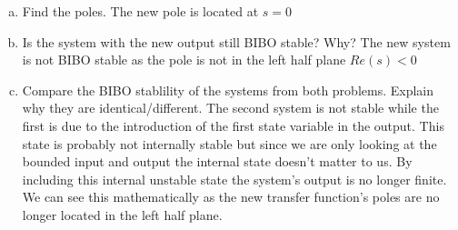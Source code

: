 \documentclass{article}
\begin{document}
\begin{enumerate}[a.]
\item Find the poles.
\newline
The new pole is located at $s=0$

\item Is the system with the new output still BIBO stable? Why?
\newline
The new system is not BIBO stable as the pole is not in the left half plane $Re(s) < 0$

\item Compare the BIBO stablility of the systems from both problems. Explain why they are identical/different.
\newline
The second system is not stable while the first is due to the introduction of the first state variable in the output.
This state is probably not internally stable but since we are only looking at the bounded input and output the internal state doesn't matter to us.
By including this internal unstable state the system's output is no longer finite.
We can see this mathematically as the new transfer function's poles are no longer located in the left half plane.

\end{enumerate}
\end{document}
